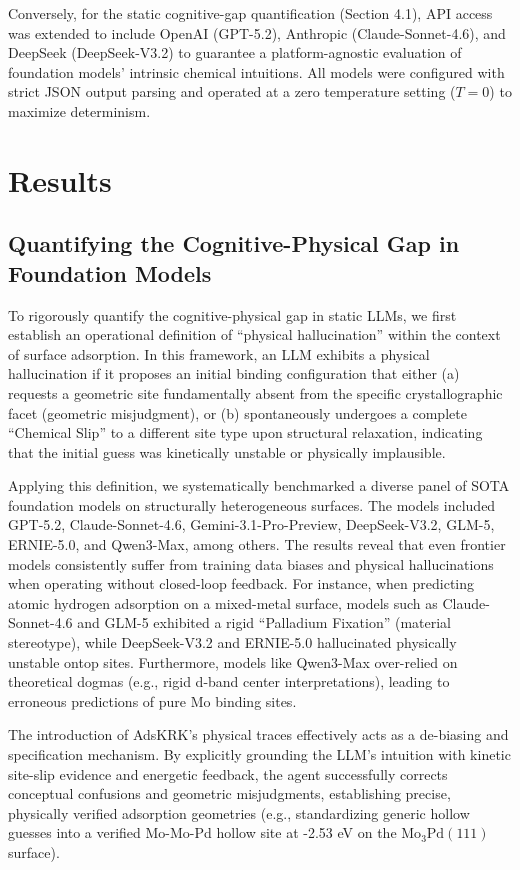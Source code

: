 \documentclass{article}
\begin{document}
Conversely, for the static cognitive-gap quantification (Section 4.1), API access was extended to include OpenAI (GPT-5.2), Anthropic (Claude-Sonnet-4.6), and DeepSeek (DeepSeek-V3.2) to guarantee a platform-agnostic evaluation of foundation models' intrinsic chemical intuitions. All models were configured with strict JSON output parsing and operated at a zero temperature setting ($T=0$) to maximize determinism.

\section{Results}
\subsection{Quantifying the Cognitive-Physical Gap in Foundation Models}

To rigorously quantify the cognitive-physical gap in static LLMs, we first establish an operational definition of ``physical hallucination'' within the context of surface adsorption. In this framework, an LLM exhibits a physical hallucination if it proposes an initial binding configuration that either (a) requests a geometric site fundamentally absent from the specific crystallographic facet (geometric misjudgment), or (b) spontaneously undergoes a complete ``Chemical Slip'' to a different site type upon structural relaxation, indicating that the initial guess was kinetically unstable or physically implausible.

Applying this definition, we systematically benchmarked a diverse panel of SOTA foundation models on structurally heterogeneous surfaces. The models included GPT-5.2, Claude-Sonnet-4.6, Gemini-3.1-Pro-Preview, DeepSeek-V3.2, GLM-5, ERNIE-5.0, and Qwen3-Max, among others. The results reveal that even frontier models consistently suffer from training data biases and physical hallucinations when operating without closed-loop feedback. For instance, when predicting atomic hydrogen adsorption on a mixed-metal surface, models such as Claude-Sonnet-4.6 and GLM-5 exhibited a rigid ``Palladium Fixation'' (material stereotype), while DeepSeek-V3.2 and ERNIE-5.0 hallucinated physically unstable ontop sites. Furthermore, models like Qwen3-Max over-relied on theoretical dogmas (e.g., rigid d-band center interpretations), leading to erroneous predictions of pure Mo binding sites.

The introduction of AdsKRK's physical traces effectively acts as a de-biasing and specification mechanism. By explicitly grounding the LLM's intuition with kinetic site-slip evidence and energetic feedback, the agent successfully corrects conceptual confusions and geometric misjudgments, establishing precise, physically verified adsorption geometries (e.g., standardizing generic hollow guesses into a verified Mo-Mo-Pd hollow site at -2.53 eV on the $\text{Mo}_{3}\text{Pd}(111)$ surface).
\end{document}
